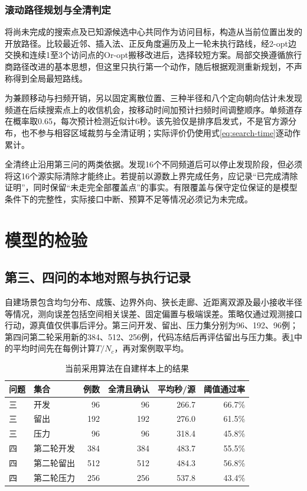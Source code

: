 \documentclass{JXUSTmodeling}
\begin{document}
\subsubsection{滚动路径规划与全清判定}
将尚未完成的搜索点及已知源候选中心共同作为访问目标，构造从当前位置出发的开放路径。比较最近邻、插入法、正反角度遍历及上一轮未执行路线，经2-opt边交换和连续1至3个访问点的Or-opt搬移改进后，选择较短方案。局部交换遵循旅行商路径改进的基本思想\cite{croes1958}，但这里只执行第一个动作，随后根据观测重新规划，不声称得到全局最短路线。

为兼顾移动与扫频开销，另以固定离散位置、三种半径和八个定向朝向估计未发现频道在后续搜索点上的收信机会，按移动时间加预计扫频时间调整顺序。单频道存在概率取0.65，每次预计检测近似计6秒。该先验仅是排序启发式，不是官方源分布，也不参与相容区域裁剪与全清证明；实际评价仍使用式\eqref{eq:search-time}逐动作累计。

全清终止沿用第三问的两类依据。发现16个不同频道后可以停止发现阶段，但必须将这16个源实际清除才能终止。若提前以源数上界完成任务，应记录“已完成清除证明”，同时保留“未走完全部覆盖点”的事实。有限覆盖与保守定位保证的是模型条件下的完整性，实际接口中断、预算不足等情况必须记为未完成。


\section{模型的检验}\label{sec:6}

\subsection{第三、四问的本地对照与执行记录}
\label{sub:verify-p34}
自建场景包含均匀分布、成簇、边界外向、狭长走廊、近距离双源及最小接收半径等情况，测向误差包括空间相关误差、固定偏置与极端误差。策略仅通过观测接口行动，源真值仅供事后评分。第三问开发、留出、压力集分别为96、192、96例；第四问第二轮采用新的384、512、256例，代码冻结后再评估留出与压力集。表\ref{tab:search-local}中的平均时间先在每例计算$T/N_c$，再对案例取平均。

\begin{table}[htbp]
\centering\small
\caption{当前采用算法在自建样本上的结果}
\label{tab:search-local}
\begin{tabular}{llrrrr}
\toprule
问题 & 集合 & 例数 & 全清且确认 & 平均秒/源 & 阈值通过率\\
\midrule
三 & 开发 &96&96&266.7&66.7\%\\
三 & 留出 &192&192&276.0&61.5\%\\
三 & 压力 &96&96&318.4&45.8\%\\
四 & 第二轮开发 &384&384&483.7&55.5\%\\
四 & 第二轮留出 &512&512&484.3&56.8\%\\
四 & 第二轮压力 &256&256&537.8&43.4\%\\
\bottomrule
\end{tabular}
\end{table}
\end{document}
